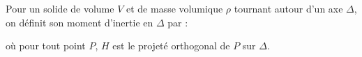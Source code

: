 ﻿\documentclass[a4paper]{article}
\begin{document}
\pagestyle{fancy}
\fancyhf{}
\setlength{\headheight}{15pt}

\begin{center}
	\large{}
\end{center}


Pour un solide de volume \(V\) et de masse volumique \(\rho\) tournant autour d'un axe \(\Delta\), on définit son moment d'inertie en \(\Delta\) par :
\begin{center}
\end{center}
où pour tout point \(P\), \(H\) est le projeté orthogonal de \(P\) sur \(\Delta\).
\end{document}

